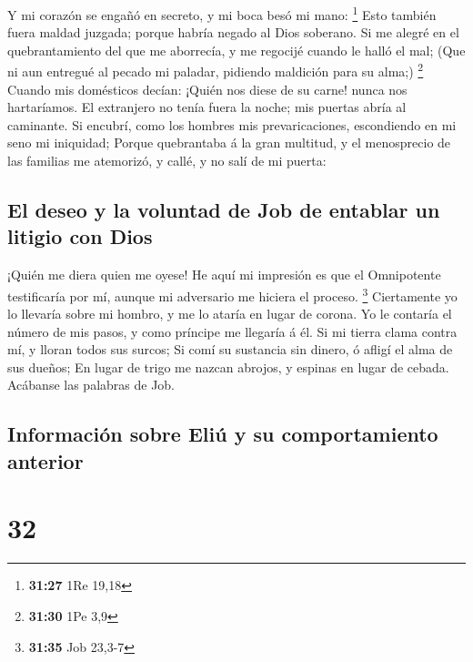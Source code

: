  Y mi corazón se engañó en secreto, y mi boca besó mi
mano: \footnote{\textbf{31:27} 1Re 19,18}  Esto también
fuera maldad juzgada; porque habría negado al Dios soberano.
 Si me alegré en el quebrantamiento del que me aborrecía,
y me regocijé cuando le halló el mal;  (Que ni aun
entregué al pecado mi paladar, pidiendo maldición para su alma;)
\footnote{\textbf{31:30} 1Pe 3,9}  Cuando mis domésticos
decían: ¡Quién nos diese de su carne! nunca nos hartaríamos.
 El extranjero no tenía fuera la noche; mis puertas abría
al caminante.  Si encubrí, como los hombres mis
prevaricaciones, escondiendo en mi seno mi iniquidad; 
Porque quebrantaba á la gran multitud, y el menosprecio de las familias
me atemorizó, y callé, y no salí de mi puerta:

\hypertarget{el-deseo-y-la-voluntad-de-job-de-entablar-un-litigio-con-dios}{%
\subsection{El deseo y la voluntad de Job de entablar un litigio con
Dios}\label{el-deseo-y-la-voluntad-de-job-de-entablar-un-litigio-con-dios}}

 ¡Quién me diera quien me oyese! He aquí mi impresión es
que el Omnipotente testificaría por mí, aunque mi adversario me hiciera
el proceso. \footnote{\textbf{31:35} Job 23,3-7} 
Ciertamente yo lo llevaría sobre mi hombro, y me lo ataría en lugar de
corona.  Yo le contaría el número de mis pasos, y como
príncipe me llegaría á él.  Si mi tierra clama contra mí,
y lloran todos sus surcos;  Si comí su sustancia sin
dinero, ó afligí el alma de sus dueños;  En lugar de
trigo me nazcan abrojos, y espinas en lugar de cebada. Acábanse las
palabras de Job.

\hypertarget{informaciuxf3n-sobre-eliuxfa-y-su-comportamiento-anterior}{%
\subsection{Información sobre Eliú y su comportamiento
anterior}\label{informaciuxf3n-sobre-eliuxfa-y-su-comportamiento-anterior}}

\hypertarget{section-31}{%
\section{32}\label{section-31}}

